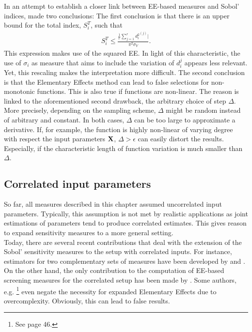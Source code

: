 \documentclass[a4paper,12pt]{article}
\begin{document}
In an attempt to establish a closer link between EE-based measures and Sobol' indices, \cite{kucherenko2009derivative} made two conclusions: The first conclusion is that there is an upper bound for the total index, $S_i^T$, such that
\begin{align}
S_i^T \leq \frac{\frac{1}{r} \sum_{j=1}^{r} {d_i^2}^{(j)}|}{\pi^2 \sigma_Y}.
\end{align}
This expression makes use of the squared EE. In light of this characteristic, the use of $\sigma_i$ as measure that aims to include the variation of $d_i^{j}$ appears less relevant. Yet, this rescaling makes the interpretation more difficult. The second conclusion is that the Elementary Effects method can lead to false selections for non-monotonic functions. This is also true if functions are non-linear. The reason is linked to the aforementioned second drawback, the arbitrary choice of step $\Delta$. More precisely, depending on the sampling scheme, $\Delta$ might be random instead of arbitrary and constant. In both cases, $\Delta$ can be too large to approximate a derivative. If, for example, the function is highly non-linear of varying degree with respect the input parameters $\bold{X}$, $\Delta > \epsilon$ can easily distort the results. Especially, if the characteristic length of function variation is much smaller than $\Delta$.



\subsection{Correlated input parameters}

So far, all measures described in this chapter assumed uncorrelated input parameters. Typically, this assumption is not met by realistic applications as joint estimations of parameters tend to produce correlated estimates. This gives reason to expand sensitivity measures to a more general setting.\\

\noindent
Today, there are several recent contributions that deal with the extension of the Sobol' sensitivity measures to the setup with correlated inputs. For instance, estimators for two complementary sets of measures have been developed by \cite{kucherenko2012estimation} and \cite{mara2015non}.
On the other hand, the only contribution to the computation of EE-based screening measures for the correlated setup has been made by \cite{ge2017extending}. Some authors, e.g. \cite{Saltelli.2004}\footnote{See page 46.} even negate the necessity for expanded Elementary Effects due to overcomplexity. Obviously, this can lead to false results.\\
\end{document}
